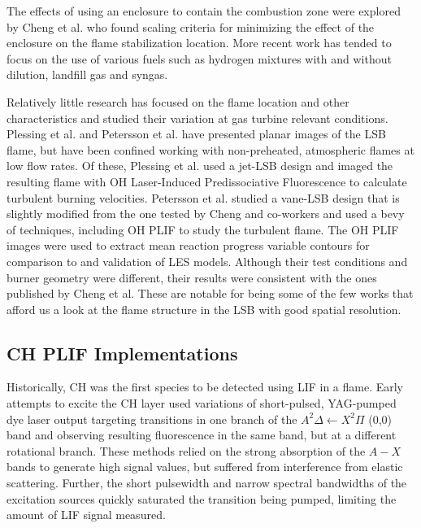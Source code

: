 The effects of using an enclosure to contain the combustion zone were explored by Cheng et al.\cite{2008-cheng-c} who found scaling criteria for minimizing the effect of the enclosure on the flame stabilization location. 
More recent work has tended to focus on the use of various fuels such as hydrogen mixtures\cite{2008-cheng-b} with and without dilution\cite{2007-littlejohn}, landfill gas\cite{2008-cheng-a,2009-cheng} and syngas\cite{2010-littlejohn}.

Relatively little research has focused on the flame location and other characteristics and studied their variation at gas turbine relevant conditions.
Plessing et al.\cite{2000-plessing} and Petersson et al.\cite{2007-petersson} have presented planar images of the LSB flame, but have been confined working with non-preheated, atmospheric flames at low flow rates.
Of these, Plessing et al. used a jet-LSB design and imaged the resulting flame with OH Laser-Induced Predissociative Fluorescence to calculate turbulent burning velocities.
Petersson et al. studied a vane-LSB design that is slightly modified from the one tested by Cheng and co-workers and used a bevy of techniques, including OH PLIF to study the turbulent flame.
The OH PLIF images were used to extract mean reaction progress variable contours for comparison to and validation of LES models.
Although their test conditions and burner geometry were different, their results were consistent with the ones published by Cheng et al.
These are notable for being some of the few works that afford us a look at the flame structure in the LSB with good spatial resolution.

\subsection{CH PLIF Implementations}

Historically, CH was the first species to be detected using LIF in a flame.\cite{1973-barnes}
Early attempts\cite{1981-verdieck,1986-allen} to excite the CH layer used variations of short-pulsed, YAG-pumped dye laser output targeting transitions in one branch of the \(A^2\Delta\leftarrow X^2\Pi\) (0,0) band and observing resulting fluorescence in the same band, but at a different rotational branch.
These methods relied on the strong absorption of the \(A-X\) bands to generate high signal values, but suffered from interference from elastic scattering.
Further, the short pulsewidth and narrow spectral bandwidths of the excitation sources quickly saturated the transition being pumped, limiting the amount of LIF signal measured.

